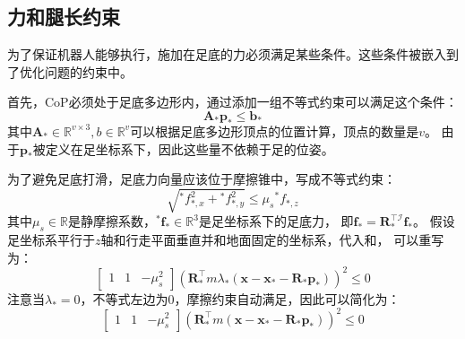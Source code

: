 \subsection{力和腿长约束}
\label{constraints}
为了保证机器人能够执行，施加在足底的力必须满足某些条件。这些条件被嵌入到了优化问题的约束中。

首先，CoP必须处于足底多边形内，通过添加一组不等式约束可以满足这个条件：
\begin{equation}
    \label{equ:inequ_constraint}
    \boldsymbol{A}_* \boldsymbol{p}_* \leq \boldsymbol{b}_*
\end{equation}
其中$\boldsymbol{A}_* \in \mathbb{R}^{v \times 3}, b \in \mathbb{R}^{v}$可以根据足底多边形顶点的位置计算，顶点的数量是$v$。
由于$\boldsymbol{p}_*$被定义在足坐标系下，因此这些量不依赖于足的位姿。

为了避免足底打滑，足底力向量应该位于摩擦锥中，写成不等式约束：
\begin{equation}
    \label{equ:friction}
    \sqrt{{ }^* f_{*, x}^2+{ }^* f_{*, y}^2} \leq \mu_s{ }^* f_{*, z}
\end{equation}
其中$\mu_s \in \mathbb{R}$是静摩擦系数，${ }^* \boldsymbol{f}_* \in \mathbb{R}^{3}$是足坐标系下的足底力，
即$\boldsymbol{f}_*=\boldsymbol{R}_*^{\top \mathcal{I}} \boldsymbol{f}_*$。
假设足坐标系平行于$z$轴和行走平面垂直并和地面固定的坐标系，代入和，
可以重写为：
\begin{equation}
    \label{equ:friction_2}
    \left[\begin{array}{lll}
        1 & 1 & -\mu_s^2
        \end{array}\right]\left(\boldsymbol{R}_*^{\top} m \lambda_*\left(\boldsymbol{x}-\boldsymbol{x}_*-\boldsymbol{R}_* \boldsymbol{p}_*\right)\right)^2 \leq 0
\end{equation}
注意当$\lambda_*=0$，不等式左边为0，摩擦约束自动满足，因此可以简化为：
\begin{equation}
    \label{equ:friction_simplify}
    \left[\begin{array}{lll}
        1 & 1 & -\mu_s^2
        \end{array}\right]\left(\boldsymbol{R}_*^{\top} m \left(\boldsymbol{x}-\boldsymbol{x}_*-\boldsymbol{R}_* \boldsymbol{p}_*\right)\right)^2 \leq 0
\end{equation}

